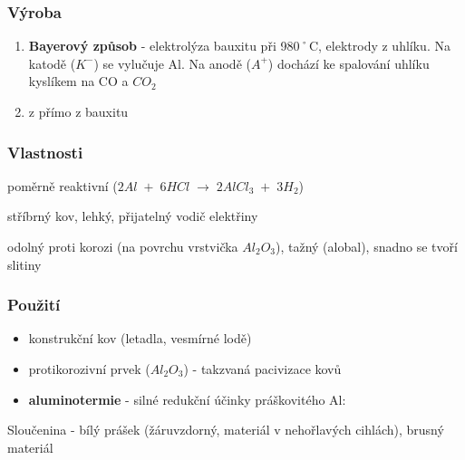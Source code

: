 \subsubsection{Výroba}
\begin{enumerate}
    \item \textbf{Bayerový způsob}
        - elektrolýza bauxitu při 980˚C, elektrody z uhlíku.
        Na katodě ($K^-$) se vylučuje Al.
        Na anodě ($A^+$) dochází ke spalování uhlíku kyslíkem na CO a $CO_2$
    \item  z přímo z bauxitu
\end{enumerate}

\subsubsection{Vlastnosti}
poměrně reaktivní ($2Al \; + \; 6HCl \; \longrightarrow \; 2AlCl_3 \; + \; 3H_2$)

stříbrný kov, lehký, přijatelný vodič elektřiny

odolný proti korozi (na povrchu vrstvička $Al_2O_3$), tažný (alobal), snadno se tvoří slitiny

\subsubsection{Použití}
\begin{itemize}
    \item konstrukční kov (letadla, vesmírné lodě)
    \item protikorozivní prvek ($Al_2O_3$) - takzvaná pacivizace kovů
    \item \textbf{aluminotermie} - silné redukční účinky práškovitého Al:
\end{itemize}

\begin{multicols}{2}

    


\end{multicols}

Sloučenina  - bílý prášek (žáruvzdorný, materiál v nehořlavých cihlách), brusný materiál



